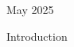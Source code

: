 \documentclass[11pt,xcolor={dvipsnames},hyperref={pdftex,pdfpagemode=UseNone,hidelinks,pdfdisplaydoctitle=true},usepdftitle=false]{beamer}
\title{}
\author{Juan Carlos Cruz - ira406}
\date{ME 5703 Lean Product Development and Service Systems}
\begin{document}
    
    \begin{frame}
      \titlepage
      May 2025
    \end{frame}
    
    \begin{frame}{Introduction}

    \end{frame}

    
    \lastslide
\end{document}
